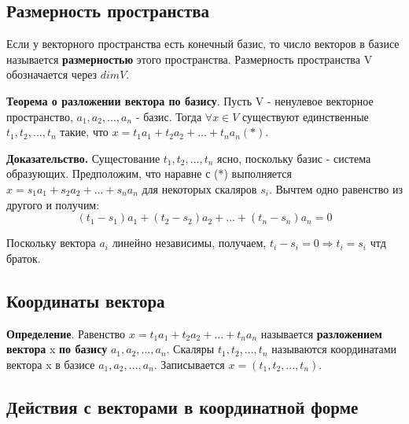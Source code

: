 \documentclass[a4paper]{article}
\begin{document}
\subsection*{Размерность пространства}
Если у векторного пространства есть конечный базис, то число векторов в базисе называется \textbf{размерностью} этого пространства.
Размерность пространства V обозначается через $dim V$.

\begin{htheorem}
\textbf{Теорема о разложении вектора по базису}. Пусть V - ненулевое векторное пространство, $a_1, a_2, ..., a_n$ - базис. Тогда $\forall x \in V$ существуют единственные $t_1, t_2, ..., t_n$ такие, что $x = t_1a_1 + t_2a_2 + ... + t_na_n (*)$.
\end{htheorem}


\begin{hproof}
\textbf{Доказательство.} Сущестование $t_1, t_2, ..., t_n$ ясно, поскольку базис - система образующих. Предположим, что наравне с (*) выполняется $x = s_1a_1 + s_2a_2 + ... + s_na_n$ для некоторых скаляров $s_i$. Вычтем одно равенство из другого и получим: \begin{equation}
(t_1-s_1)a_1 + (t_2-s_2)a_2 + ... + (t_n-s_n)a_n = 0
\end{equation}

Поскольку вектора $a_i$ линейно независимы, получаем, $t_i-s_i = 0 \Rightarrow t_i = s_i$ чтд браток.
\end{hproof}



\subsection*{Координаты вектора}
\textbf{Определение}. Равенство $x = t_1a_1 + t_2a_2 + ... + t_na_n$ называется \textbf{разложением вектора }
x \textbf{по базису} $a_1, a_2, ..., a_n$. Скаляры $t_1, t_2, ..., t_n$ называются координатами вектора x в базисе $a_1, a_2, ..., a_n$. Записывается $x = (t_1, t_2, ..., t_n)$. 

\subsection*{Действия с векторами в координатной форме}


\newpage \begin{center}\begin{Large}\end{Large}\end{center}
\end{document}
